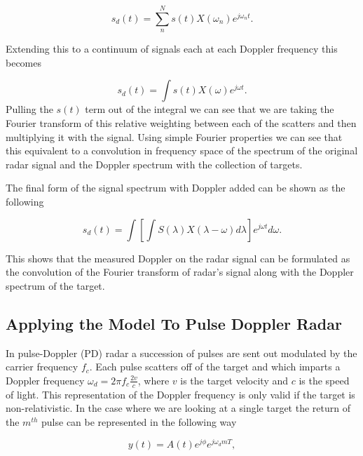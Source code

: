 \begin{equation}
\label{multiDop}
\displaystyle s_d(t) = \sum_{n}^{N} s(t)X(\omega_n)e^{j\omega_{n} t}.
\end{equation}

\noindent Extending this to a continuum of signals each at each Doppler frequency this becomes

\begin{equation}
\label{conDop}
s_d(t) = \int s(t) X(\omega)e^{j\omega t}.
\end{equation}
\noindent Pulling the $s(t)$ term out of the integral we can see that we are taking the Fourier transform of this relative weighting between each of the scatters and then multiplying it with the signal.  Using simple Fourier properties we can see that this equivalent to a convolution in frequency space of the spectrum of the original radar signal and the Doppler spectrum with the collection of targets.  

The final form of the signal spectrum with Doppler added can be shown as the following

\begin{equation}
\label{finalDop}
s_d(t) = \int \left[\int S(\lambda)X(\lambda-\omega)d\lambda\right] e^{j\omega t}d\omega.
\end{equation}

\noindent This shows that the measured Doppler on the radar signal can be formulated as the convolution of the Fourier transform of radar's signal along with the Doppler spectrum of the target.

\subsection{Applying the Model To Pulse Doppler Radar}

In pulse-Doppler (PD) radar a succession of pulses are sent out modulated by the carrier frequency $f_c$.  Each pulse scatters off of the target and which imparts a Doppler frequency $\omega_d = 2\pi f_c \frac{2v}{c}$, where $v$ is the target velocity and $c$ is the speed of light.  This representation of the Doppler frequency is only valid if the target is non-relativistic.  In the case where we are looking at a single target the return of the $m^{th}$ pulse can be represented in the following way\cite{richards:fundamentalsigproc}

\begin{equation}
\label{pdpulse}
y(t) =  A(t)e^{j\phi}e^{j\omega_dmT},
\end{equation}

